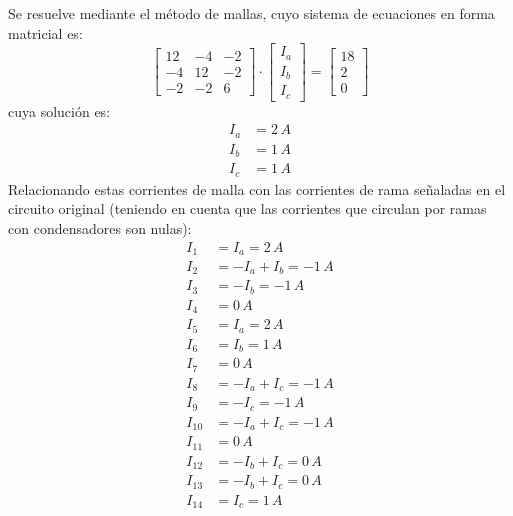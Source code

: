 Se resuelve mediante el método de mallas, cuyo sistema de ecuaciones
en forma matricial es:
\begin{equation*}
  \begin{bmatrix}
    12 & -4 & -2 \\
    -4 & 12 & -2\\
    -2 & -2 & 6
  \end{bmatrix}
  \cdot\begin{bmatrix}
         I_a\\
         I_b\\
         I_c
       \end{bmatrix}
       =
       \begin{bmatrix}
         18\\
         2\\
         0
       \end{bmatrix}
     \end{equation*}
     cuya solución es:
     \begin{align*}
       I_{a} & =  2\, A\\
       I_{b} & =  1\, A\\
       I_{c} & =  1\, A
     \end{align*}
     Relacionando estas corrientes de malla con las corrientes de rama
     señaladas en el circuito original (teniendo en cuenta que las
     corrientes que circulan por ramas con condensadores son nulas):
     \begin{align*}
       I_{1} & =  I_{a}=2\, A\\
       I_{2} & =  -I_{a}+I_{b}=-1\, A\\
       I_{3} & =  -I_{b}=-1\, A\\
       I_{4} & =  0\, A\\
       I_{5} & =  I_{a}=2\, A\\
       I_{6} & =  I_{b}=1\, A\\
       I_{7} & =  0\, A\\
       I_{8} & =  -I_{a}+I_{c}=-1\, A\\
       I_{9} & =  -I_{c}=-1\, A\\
       I_{10} & = -I_{a}+I_{c}=-1\, A\\
       I_{11} & =  0\, A\\
       I_{12} & =  -I_{b}+I_{c}=0\, A\\
       I_{13} & =  -I_{b}+I_{c}=0\, A\\
       I_{14} & =  I_{c}=1\, A
     \end{align*}

